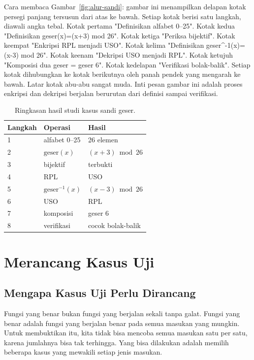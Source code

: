 \documentclass[11pt,a4paper]{article}
\begin{document}
Cara membaca Gambar~\ref{fig:alur-sandi}: gambar ini menampilkan delapan kotak persegi panjang tersusun dari atas ke bawah. Setiap kotak berisi satu langkah, diawali angka tebal. Kotak pertama "Definisikan alfabet 0--25". Kotak kedua "Definisikan geser(x)=(x+3) mod 26". Kotak ketiga "Periksa bijektif". Kotak keempat "Enkripsi RPL menjadi USO". Kotak kelima "Definisikan geser^-1(x)=(x-3) mod 26". Kotak keenam "Dekripsi USO menjadi RPL". Kotak ketujuh "Komposisi dua geser = geser 6". Kotak kedelapan "Verifikasi bolak-balik". Setiap kotak dihubungkan ke kotak berikutnya oleh panah pendek yang mengarah ke bawah. Latar kotak abu-abu sangat muda. Inti pesan gambar ini adalah proses enkripsi dan dekripsi berjalan berurutan dari definisi sampai verifikasi.

\begin{table}[H]
	\centering
	\caption{Ringkasan hasil studi kasus sandi geser.}
	\label{tab:studi-sandi}
	\small
	\begin{tabularx}{\textwidth}{l X l}
		\toprule
		Langkah & Operasi                & Hasil             \\
		\midrule
		1       & alfabet 0--25          & 26 elemen         \\
		2       & $\text{geser}(x)$      & $(x+3) \bmod 26$  \\
		3       & bijektif               & terbukti          \\
		4       & RPL                    & USO               \\
		5       & $\text{geser}^{-1}(x)$ & $(x-3) \bmod 26$  \\
		6       & USO                    & RPL               \\
		7       & komposisi              & geser 6           \\
		8       & verifikasi             & cocok bolak-balik \\
		\bottomrule
	\end{tabularx}
\end{table}

\section{Merancang Kasus Uji}

\subsection{Mengapa Kasus Uji Perlu Dirancang}

Fungsi yang benar bukan fungsi yang berjalan sekali tanpa galat. Fungsi yang benar adalah fungsi yang berjalan benar pada semua masukan yang mungkin. Untuk membuktikan itu, kita tidak bisa mencoba semua masukan satu per satu, karena jumlahnya bisa tak terhingga. Yang bisa dilakukan adalah memilih beberapa kasus yang mewakili setiap jenis masukan.
\end{document}
